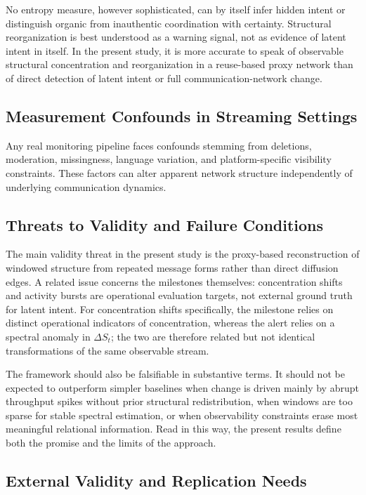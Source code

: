 \documentclass[sigconf]{acmart}
\begin{document}
No entropy measure, however sophisticated, can by itself infer hidden intent or distinguish organic from inauthentic coordination with certainty. Structural reorganization is best understood as a warning signal, not as evidence of latent intent in itself. In the present study, it is more accurate to speak of observable structural concentration and reorganization in a reuse-based proxy network than of direct detection of latent intent or full communication-network change.

\subsection{Measurement Confounds in Streaming Settings}

Any real monitoring pipeline faces confounds stemming from deletions, moderation, missingness, language variation, and platform-specific visibility constraints. These factors can alter apparent network structure independently of underlying communication dynamics.

\subsection{Threats to Validity and Failure Conditions}

The main validity threat in the present study is the proxy-based reconstruction of windowed structure from repeated message forms rather than direct diffusion edges. A related issue concerns the milestones themselves: concentration shifts and activity bursts are operational evaluation targets, not external ground truth for latent intent. For concentration shifts specifically, the milestone relies on distinct operational indicators of concentration, whereas the alert relies on a spectral anomaly in $\Delta S_t$; the two are therefore related but not identical transformations of the same observable stream.

The framework should also be falsifiable in substantive terms. It should not be expected to outperform simpler baselines when change is driven mainly by abrupt throughput spikes without prior structural redistribution, when windows are too sparse for stable spectral estimation, or when observability constraints erase most meaningful relational information. Read in this way, the present results define both the promise and the limits of the approach.

\subsection{External Validity and Replication Needs}
\end{document}
